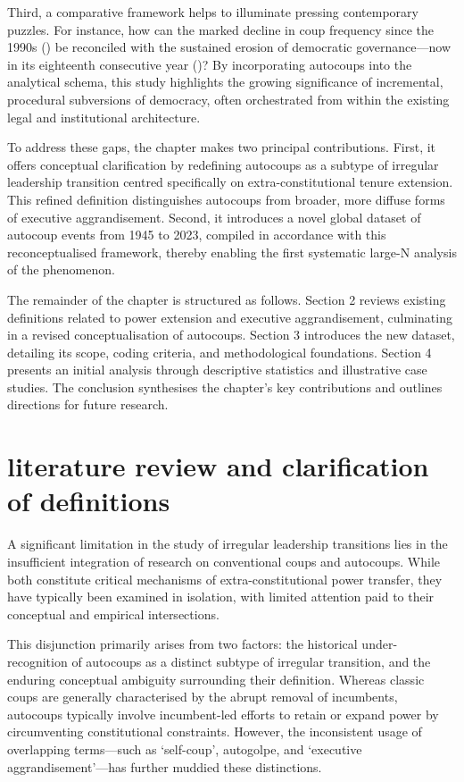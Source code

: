\documentclass[
  12pt,
]{report}
\begin{document}
Third, a comparative framework helps to illuminate pressing contemporary
puzzles. For instance, how can the marked decline in coup frequency
since the 1990s () be reconciled
with the sustained erosion of democratic governance---now in its
eighteenth consecutive year
()? By
incorporating autocoups into the analytical schema, this study
highlights the growing significance of incremental, procedural
subversions of democracy, often orchestrated from within the existing
legal and institutional architecture.

To address these gaps, the chapter makes two principal contributions.
First, it offers conceptual clarification by redefining autocoups as a
subtype of irregular leadership transition centred specifically on
extra-constitutional tenure extension. This refined definition
distinguishes autocoups from broader, more diffuse forms of executive
aggrandisement. Second, it introduces a novel global dataset of autocoup
events from 1945 to 2023, compiled in accordance with this
reconceptualised framework, thereby enabling the first systematic
large-N analysis of the phenomenon.

The remainder of the chapter is structured as follows. Section 2 reviews
existing definitions related to power extension and executive
aggrandisement, culminating in a revised conceptualisation of autocoups.
Section 3 introduces the new dataset, detailing its scope, coding
criteria, and methodological foundations. Section 4 presents an initial
analysis through descriptive statistics and illustrative case studies.
The conclusion synthesises the chapter's key contributions and outlines
directions for future research.

\section{literature review and clarification of
definitions}\label{literature-review-and-clarification-of-definitions}

A significant limitation in the study of irregular leadership
transitions lies in the insufficient integration of research on
conventional coups and autocoups. While both constitute critical
mechanisms of extra-constitutional power transfer, they have typically
been examined in isolation, with limited attention paid to their
conceptual and empirical intersections.

This disjunction primarily arises from two factors: the historical
under-recognition of autocoups as a distinct subtype of irregular
transition, and the enduring conceptual ambiguity surrounding their
definition. Whereas classic coups are generally characterised by the
abrupt removal of incumbents, autocoups typically involve incumbent-led
efforts to retain or expand power by circumventing constitutional
constraints. However, the inconsistent usage of overlapping terms---such
as `self-coup', autogolpe, and `executive aggrandisement'---has further
muddied these distinctions.
\end{document}
